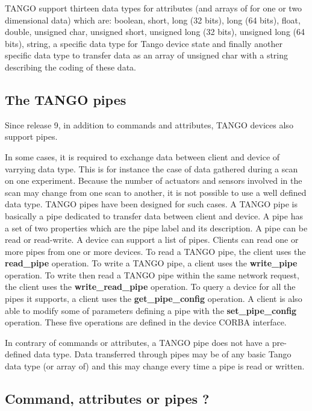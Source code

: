 TANGO support thirteen data types for attributes (and arrays of for
one or two dimensional data) which are: boolean, short, long (32 bits),
long (64 bits), float, double, unsigned char, unsigned short, unsigned
long (32 bits), unsigned long (64 bits), string, a specific data type
for Tango device state and finally another specific data type to transfer
data as an array of unsigned char with a string describing the coding
of these data.

\subsection{The TANGO pipes}

Since release 9, in addition to commands and attributes, TANGO devices
also support pipes.

In some cases, it is required to exchange data between client and
device of varrying data type. This is for instance the case of data
gathered during a scan on one experiment. Because the number of actuators
and sensors involved in the scan may change from one scan to another,
it is not possible to use a well defined data type. TANGO pipes have
been designed for such cases. A TANGO pipe is basically a pipe dedicated
to transfer data between client and device. A pipe has a set of two
properties which are the pipe label and its description. A pipe can
be read or read-write. A device can support a list of pipes. Clients
can read one or more pipes from one or more devices. To read a TANGO
pipe, the client uses the \textbf{read\_pipe} operation.
To write a TANGO pipe, a client uses the \textbf{write\_pipe}
operation. To write then read a TANGO pipe within the same network
request, the client uses the \textbf{write\_read\_pipe}
operation. To query a device for all the pipes it supports, a client
uses the \textbf{get\_pipe\_config} operation.
A client is also able to modify some of parameters defining a pipe
with the \textbf{set\_pipe\_config} operation.
These five operations are defined in the device CORBA interface.

In contrary of commands or attributes, a TANGO pipe does not have
a pre-defined data type. Data transferred through pipes may be of
any basic Tango data type (or array of) and this may change every
time a pipe is read or written. 

\subsection{Command, attributes or pipes ?}

